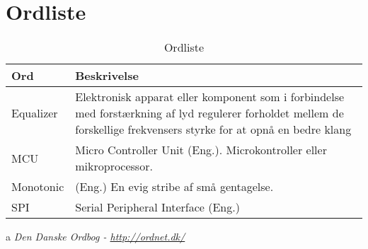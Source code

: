 \chapter{Ordliste} \label{bilag:ordliste}

\begin{table}[h!]
	\caption{Ordliste}
	\label{tab:ordliste}
	\begin{threeparttable}
		\begin{tabular}{l p{}}
			\toprule
			\textbf{Ord}      & \textbf{Beskrivelse}   \\ 
			\midrule
			Equalizer 	& Elektronisk apparat eller komponent som i forbindelse med forstærkning af lyd regulerer forholdet mellem de forskellige frekvensers styrke for at opnå en bedre klang \tnote{a} \\
			MCU       	& Micro Controller Unit (Eng.). Microkontroller eller mikroprocessor. \\
			Monotonic 	& (Eng.) En evig stribe af små gentagelse.  \tnote{a}\\
			SPI			& Serial Peripheral Interface (Eng.)  \\
			\bottomrule
		\end{tabular}
	
		\begin{tablenotes}
			\item[a] \textit{Den Danske Ordbog - \url{http://ordnet.dk/}}
		\end{tablenotes}
	\end{threeparttable}
\end{table}
